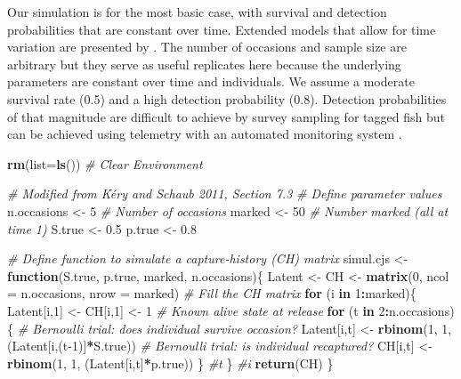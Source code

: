 \documentclass[
]{krantz}
\makeatletter
\newenvironment{Shaded}{\begin{snugshade}}{\end{snugshade}}
\newcommand{\AttributeTok}[1]{\textcolor[rgb]{0.27,0.27,0.27}{#1}}
\newcommand{\CommentTok}[1]{\textcolor[rgb]{0.37,0.37,0.37}{\textit{#1}}}
\newcommand{\ControlFlowTok}[1]{\textcolor[rgb]{0.27,0.27,0.27}{\textbf{#1}}}
\newcommand{\DecValTok}[1]{\textcolor[rgb]{0.06,0.06,0.06}{#1}}
\newcommand{\FloatTok}[1]{\textcolor[rgb]{0.06,0.06,0.06}{#1}}
\newcommand{\FunctionTok}[1]{\textcolor[rgb]{0.27,0.27,0.27}{\textbf{#1}}}
\newcommand{\NormalTok}[1]{#1}
\newcommand{\OtherTok}[1]{\textcolor[rgb]{0.37,0.37,0.37}{#1}}
\newcommand{\SpecialCharTok}[1]{\textcolor[rgb]{0.43,0.43,0.43}{\textbf{#1}}}
\newenvironment{kframe}{%
\medskip{}
\setlength{\fboxsep}{.8em}
 \def\at@end@of@kframe{}%
 \ifinner\ifhmode%
  \def\at@end@of@kframe{\end{minipage}}%
  \begin{minipage}{\columnwidth}%
 \fi\fi%
 \def\FrameCommand##1{\hskip\@totalleftmargin \hskip-\fboxsep
 \colorbox{shadecolor}{##1}\hskip-\fboxsep
     \hskip-\linewidth \hskip-\@totalleftmargin \hskip\columnwidth}%
 \MakeFramed {\advance\hsize-\width
   \@totalleftmargin\z@ \linewidth\hsize
   \@setminipage}}%
 {\par\unskip\endMakeFramed%
 \at@end@of@kframe}
\renewenvironment{Shaded}{\begin{kframe}}{\end{kframe}}
\makeatother
\begin{document}
Our simulation is for the most basic case, with survival and detection probabilities that are constant over time. Extended models that allow for time variation are presented by \citet{kéry.schaub_2012}. The number of occasions and sample size are arbitrary but they serve as useful replicates here because the underlying parameters are constant over time and individuals. We assume a moderate survival rate (0.5) and a high detection probability (0.8). Detection probabilities of that magnitude are difficult to achieve by survey sampling for tagged fish but can be achieved using telemetry with an automated monitoring system \citep{hewitt.etal_2010}.

\begin{Shaded}
\begin{Highlighting}[]
\FunctionTok{rm}\NormalTok{(}\AttributeTok{list=}\FunctionTok{ls}\NormalTok{()) }\CommentTok{\# Clear Environment}

\CommentTok{\# Modified from Kéry and Schaub 2011, Section 7.3}
\CommentTok{\# Define parameter values}
\NormalTok{n.occasions }\OtherTok{\textless{}{-}} \DecValTok{5}            \CommentTok{\# Number of occasions}
\NormalTok{marked }\OtherTok{\textless{}{-}} \DecValTok{50}                \CommentTok{\# Number marked (all at time 1)}
\NormalTok{S.true }\OtherTok{\textless{}{-}} \FloatTok{0.5}
\NormalTok{p.true }\OtherTok{\textless{}{-}} \FloatTok{0.8}

\CommentTok{\# Define function to simulate a capture{-}history (CH) matrix}
\NormalTok{simul.cjs }\OtherTok{\textless{}{-}} \ControlFlowTok{function}\NormalTok{(S.true, p.true, marked, n.occasions)\{}
\NormalTok{  Latent }\OtherTok{\textless{}{-}}\NormalTok{ CH }\OtherTok{\textless{}{-}} \FunctionTok{matrix}\NormalTok{(}\DecValTok{0}\NormalTok{, }\AttributeTok{ncol =}\NormalTok{ n.occasions, }\AttributeTok{nrow =}\NormalTok{ marked)}
  \CommentTok{\# Fill the CH matrix}
  \ControlFlowTok{for}\NormalTok{ (i }\ControlFlowTok{in} \DecValTok{1}\SpecialCharTok{:}\NormalTok{marked)\{}
\NormalTok{    Latent[i,}\DecValTok{1}\NormalTok{] }\OtherTok{\textless{}{-}}\NormalTok{ CH[i,}\DecValTok{1}\NormalTok{] }\OtherTok{\textless{}{-}} \DecValTok{1}    \CommentTok{\# Known alive state at release}
    \ControlFlowTok{for}\NormalTok{ (t }\ControlFlowTok{in} \DecValTok{2}\SpecialCharTok{:}\NormalTok{n.occasions)\{}
      \CommentTok{\# Bernoulli trial: does individual survive occasion?}
\NormalTok{      Latent[i,t] }\OtherTok{\textless{}{-}} \FunctionTok{rbinom}\NormalTok{(}\DecValTok{1}\NormalTok{, }\DecValTok{1}\NormalTok{, (Latent[i,(t}\DecValTok{{-}1}\NormalTok{)]}\SpecialCharTok{*}\NormalTok{S.true))}
      \CommentTok{\# Bernoulli trial: is individual recaptured?}
\NormalTok{      CH[i,t] }\OtherTok{\textless{}{-}} \FunctionTok{rbinom}\NormalTok{(}\DecValTok{1}\NormalTok{, }\DecValTok{1}\NormalTok{, (Latent[i,t]}\SpecialCharTok{*}\NormalTok{p.true))}
\NormalTok{    \} }\CommentTok{\#t}
\NormalTok{  \} }\CommentTok{\#i}
  \FunctionTok{return}\NormalTok{(CH)}
\NormalTok{\}}


\end{Highlighting}
\end{Shaded}
\end{document}
